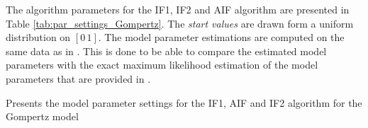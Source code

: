 \documentclass[twoside,openright]{report}
\begin{document}

The algorithm parameters for the IF1, IF2 and AIF algorithm are presented in Table \ref{tab:par_settings_Gompertz}. The \textit{start values} are drawn form a uniform distribution on $[0 \, 1]$. The model parameter estimations are computed on the same data as in \cite{king2015statistical}. This is done to be able to compare the estimated model parameters with the exact maximum likelihood estimation of the model parameters that are provided in  \cite{king2015statistical}. 


\begin{table}[h]
    \centering
    \caption{Presents the model parameter settings for the IF1, AIF and IF2 algorithm for the Gompertz model }
    \resizebox{\columnwidth}{!}{%

}
\end{table}
\end{document}
